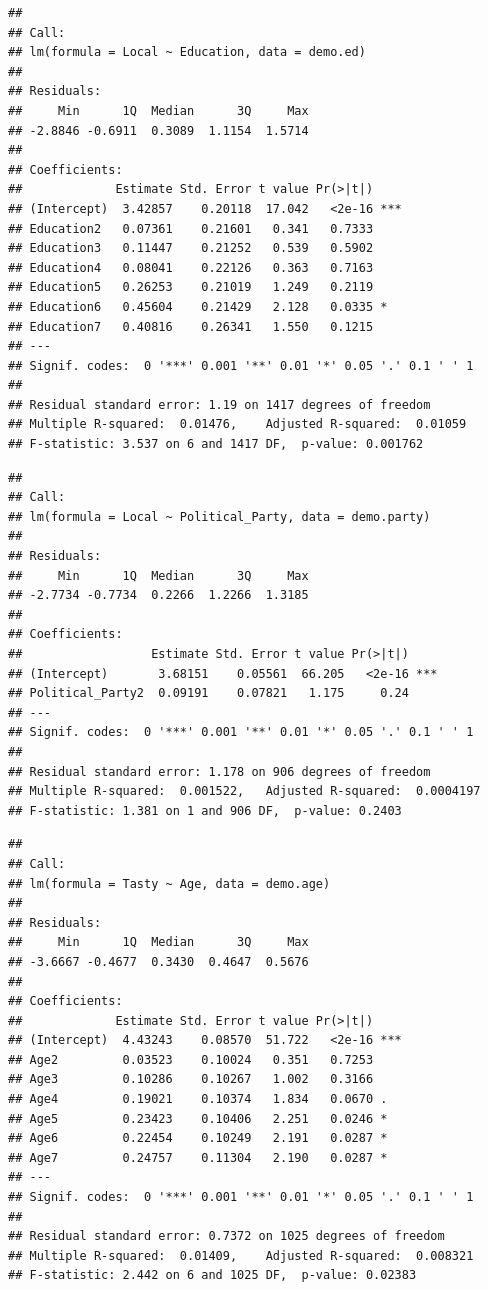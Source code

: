 \documentclass[
  12pt,
]{article}
\begin{document}
\begin{verbatim}
## 
## Call:
## lm(formula = Local ~ Education, data = demo.ed)
## 
## Residuals:
##     Min      1Q  Median      3Q     Max 
## -2.8846 -0.6911  0.3089  1.1154  1.5714 
## 
## Coefficients:
##             Estimate Std. Error t value Pr(>|t|)    
## (Intercept)  3.42857    0.20118  17.042   <2e-16 ***
## Education2   0.07361    0.21601   0.341   0.7333    
## Education3   0.11447    0.21252   0.539   0.5902    
## Education4   0.08041    0.22126   0.363   0.7163    
## Education5   0.26253    0.21019   1.249   0.2119    
## Education6   0.45604    0.21429   2.128   0.0335 *  
## Education7   0.40816    0.26341   1.550   0.1215    
## ---
## Signif. codes:  0 '***' 0.001 '**' 0.01 '*' 0.05 '.' 0.1 ' ' 1
## 
## Residual standard error: 1.19 on 1417 degrees of freedom
## Multiple R-squared:  0.01476,    Adjusted R-squared:  0.01059 
## F-statistic: 3.537 on 6 and 1417 DF,  p-value: 0.001762
\end{verbatim}

\begin{verbatim}
## 
## Call:
## lm(formula = Local ~ Political_Party, data = demo.party)
## 
## Residuals:
##     Min      1Q  Median      3Q     Max 
## -2.7734 -0.7734  0.2266  1.2266  1.3185 
## 
## Coefficients:
##                  Estimate Std. Error t value Pr(>|t|)    
## (Intercept)       3.68151    0.05561  66.205   <2e-16 ***
## Political_Party2  0.09191    0.07821   1.175     0.24    
## ---
## Signif. codes:  0 '***' 0.001 '**' 0.01 '*' 0.05 '.' 0.1 ' ' 1
## 
## Residual standard error: 1.178 on 906 degrees of freedom
## Multiple R-squared:  0.001522,   Adjusted R-squared:  0.0004197 
## F-statistic: 1.381 on 1 and 906 DF,  p-value: 0.2403
\end{verbatim}

\begin{verbatim}
## 
## Call:
## lm(formula = Tasty ~ Age, data = demo.age)
## 
## Residuals:
##     Min      1Q  Median      3Q     Max 
## -3.6667 -0.4677  0.3430  0.4647  0.5676 
## 
## Coefficients:
##             Estimate Std. Error t value Pr(>|t|)    
## (Intercept)  4.43243    0.08570  51.722   <2e-16 ***
## Age2         0.03523    0.10024   0.351   0.7253    
## Age3         0.10286    0.10267   1.002   0.3166    
## Age4         0.19021    0.10374   1.834   0.0670 .  
## Age5         0.23423    0.10406   2.251   0.0246 *  
## Age6         0.22454    0.10249   2.191   0.0287 *  
## Age7         0.24757    0.11304   2.190   0.0287 *  
## ---
## Signif. codes:  0 '***' 0.001 '**' 0.01 '*' 0.05 '.' 0.1 ' ' 1
## 
## Residual standard error: 0.7372 on 1025 degrees of freedom
## Multiple R-squared:  0.01409,    Adjusted R-squared:  0.008321 
## F-statistic: 2.442 on 6 and 1025 DF,  p-value: 0.02383
\end{verbatim}
\end{document}
